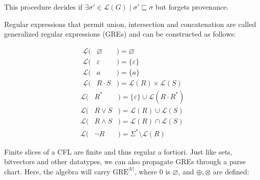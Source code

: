 \documentclass[portrait,a0b,final,a4resizeable]{a0poster}
\def\jointspacing{\vspace{0.3in}}
\begin{document}
\begin{poster}
\begin{multicols}{2}
      \null\hspace*{3cm}\begin{minipage}[c]{0.90\columnwidth}
      This procedure decides if $\exists \sigma' \in \mathcal{L}(G) \mid \sigma' \sqsubseteq \sigma$ but forgets provenance.
\vspace{1cm}
      \end{minipage}
      \jointspacing

\pagebreak
      \jointspacing

      \hspace*{2cm}\begin{minipage}[c]{0.90\columnwidth}
Regular expressions that permit union, intersection and concatenation are called generalized regular expressions (GREs) and can be constructed as follows:
\end{minipage}

\vspace{-2cm}
\setlength{\columnseprule}{0pt}
\setlength{\columnsep}{-3cm}
\begin{multicols}{2}
\begin{eqnarray*}
\mathcal{L}(& \varnothing & ) = \varnothing \\
\mathcal{L}(& \varepsilon & ) = \{\varepsilon\} \\
\mathcal{L}(& a           & ) = \{a\}\\
\mathcal{L}(& R\cdot S    & ) = \mathcal{L}(R) \times \mathcal{L}(S)
\end{eqnarray*} \break\vspace{-0.45cm}
\begin{eqnarray*}
\mathcal{L}(& R^*         & ) = \{\varepsilon\} \cup \mathcal{L}(R\cdot R^*)\\
\mathcal{L}(& R\vee S     & ) = \mathcal{L}(R) \cup \mathcal{L}(S)\\
\mathcal{L}(& R\land S    & ) = \mathcal{L}(R) \cap \mathcal{L}(S)\\
\mathcal{L}(& \neg R      & ) = \Sigma^* \setminus \mathcal{L}(R)
\end{eqnarray*}
\end{multicols}

\jointspacing

\hspace*{2cm}\begin{minipage}[c]{0.90\columnwidth}
Finite slices of a CFL are finite and thus regular a fortiori. Just like sets, bitvectors and other datatypes, we can also propagate GREs through a parse chart. Here, the algebra will carry $\text{GRE}^{|V|}$, where 0 is $\varnothing$, and $\oplus, \otimes$ are defined:
\end{minipage}


\end{multicols}
\end{poster}
\end{document}
